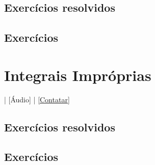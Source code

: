 \emconstrucao

\subsection*{Exercícios resolvidos}

\emconstrucao

\subsection*{Exercícios}

\emconstrucao

\section{Integrais Impróprias}\label{cap_int_sec_intimp}

\begin{flushright}
  [Vídeo] | [Áudio] | \href{https://phkonzen.github.io/notas/contato.html}{[Contatar]}
\end{flushright}

\emconstrucao

\subsection*{Exercícios resolvidos}

\emconstrucao

\subsection*{Exercícios}

\emconstrucao
